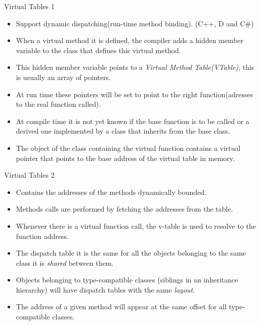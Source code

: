 \begin{frame}{Virtual Tables 1} 
    \begin{itemize}
        \item Support dynamic dispatching(run-time method binding). (C++, D and C\#)
        \item When a virtual method it is defined, the compiler adds a hidden member variable to the class that defines this virtual method.
        \item This hidden member variable points to a \emph{Virtual Method Table(VTable)}, this is usually an array of pointers.
        \item At run time these pointers will be set to point to the right function(adresses to the real function called). 
        \item At compile time it is not yet known if the base function is to be called or a derived one implemented  by a class that inherits from the base class.
        \item  The object of the class containing the virtual function contains a virtual pointer that points to the base address of the virtual table in memory.
    \end{itemize}
\end{frame}

\begin{frame}{Virtual Tables 2} 
    \begin{itemize}
        \item Contains the addresses of the methods dynamically bounded.
        \item Methods calls are performed by fetching the addresses from the table.
        \item Whenever there is a virtual function call, the v-table is used to resolve to the function address.
        \item The dispatch table it is the same for all the objects belonging to the same class it is \emph{shared} between them.
        \item Objects belonging to type-compatible classes (siblings in an inheritance hierarchy) will have dispatch tables with the same \emph{layout}.
        \item The address of a given method will appear at the same offset for all type-compatible classes.
    \end{itemize}
\end{frame}

